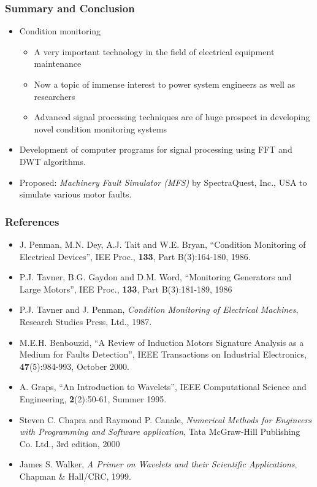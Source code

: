 \documentclass[9pt]{beamer}
\begin{document}
\begin{frame}
\frametitle{Summary and Conclusion}


\begin{itemize} 
\item Condition monitoring
\begin{itemize}
\item A very important technology in the field of electrical equipment maintenance
\item Now a topic of immense interest to power system engineers as well as researchers

\item Advanced signal processing techniques are of huge prospect in developing novel condition monitoring systems
\end{itemize} 

\item Development of computer programs for signal processing using FFT and DWT algorithms.

\item Proposed: \emph{Machinery Fault Simulator (MFS)} by SpectraQuest, Inc., USA to simulate various motor faults.
\end{itemize} 
\end{frame}

\begin{frame}
\frametitle{References}


\begin{itemize} 
    \item J. Penman, M.N. Dey, A.J. Tait and W.E. Bryan, ``Condition Monitoring of Electrical Devices'', IEE Proc., \textbf{133}, Part B(3):164-180, 1986.
    \item P.J. Tavner, B.G. Gaydon and D.M. Word, ``Monitoring Generators and Large Motors'', IEE Proc., \textbf{133}, Part B(3):181-189, 1986
    \item P.J. Tavner and J. Penman, \emph{Condition Monitoring of Electrical Machines}, Research Studies Press, Ltd., 1987.
    \item M.E.H. Benbouzid, ``A Review of Induction Motors Signature Analysis as a Medium  for  Faults  Detection'',  IEEE  Transactions on Industrial Electronics, \textbf{47}(5):984-993, October 2000.
    \item A. Graps, ``An Introduction to Wavelets'', IEEE Computational Science and Engineering, \textbf{2}(2):50-61, Summer 1995.
    \item Steven C. Chapra and Raymond P. Canale, \emph{Numerical Methods for Engineers with Programming and Software application}, Tata McGraw-Hill Publishing Co. Ltd., 3rd edition, 2000
    \item James S. Walker, \emph{A Primer on Wavelets and their Scientific Applications}, Chapman \& Hall/CRC, 1999.
\end{itemize}
\end{frame}
\end{document}
